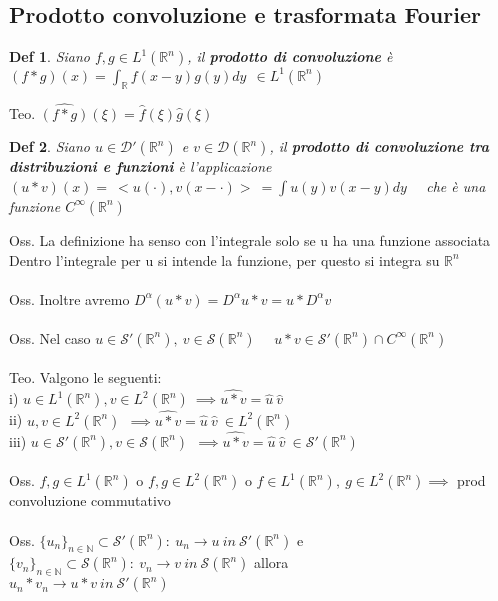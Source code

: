 \documentclass{article}
\theoremstyle{unnumbered}
\newtheorem* {theoremT}{Def}
\theoremstyle{unnumbered1}
\newenvironment{defi}{\begin{gBox}\begin{theoremT}}{\end{theoremT}\end{gBox}}
\renewcommand{\hat}{\widehat}
\begin{document}
\subsection{Prodotto convoluzione e trasformata Fourier}
%
\begin{defi}
Siano $f,g\in L^1(\mathbb{R}^n)$, il \textbf{prodotto di convoluzione} è $(f*g)(x)=\int_{\mathbb{R}}f(x-y)g(y)dy\ \ \in L^1(\mathbb{R}^n)$
\end{defi}
%
Teo. $\widehat{(f*g)}(\xi)=\widehat{f}(\xi)\hat{g}(\xi)$\\
%
%
\begin{defi}
Siano $u\in\mathcal{D}'(\mathbb{R}^n)$ e $v\in\mathcal{D}(\mathbb{R}^n)$, il \textbf{prodotto di convoluzione tra distribuzioni e funzioni} è l'applicazione $(u*v)(x)= \ <u(\cdot),v(x-\cdot)>\ =\int u(y)v(x-y) dy $ \ \  che è una funzione $C^{\infty}(\mathbb{R}^n)$
\end{defi}
%
Oss. La definizione ha senso con l'integrale solo se u ha una funzione associata \\
Dentro l'integrale per u si intende la funzione, per questo si integra su $\mathbb{R}^n$\\ \\
%
Oss. Inoltre avremo $D^{\alpha}(u*v)=D^{\alpha}u *v=u*D^{\alpha}v$\\ \\
%
%
Oss. Nel caso $u\in\mathcal{S}'(\mathbb{R}^n), \ v\in\mathcal{S}(\mathbb{R}^n)$ \ \ $u*v \in \mathcal{S}'(\mathbb{R}^n)\cap C^{\infty}(\mathbb{R}^n)$\\ \\
%
%
Teo. Valgono le seguenti: \\
i) $u\in L^1(\mathbb{R}^n), v\in L^2(\mathbb{R}^n) \ \implies \hat{u*v}=\hat{u} \ \hat{v}$\\
ii) $u,v\in L^2(\mathbb{R}^n) \ \ \implies \hat{u*v}=\hat{u}\ \hat{v} \ \in L^2(\mathbb{R}^n)$\\
iii) $u\in\mathcal{S}'(\mathbb{R}^n), v\in\mathcal{S}(\mathbb{R}^n) \ \ \implies \hat{u*v}=\hat{u}\ \hat{v} \ \in \mathcal{S}'(\mathbb{R}^n)$\\ \\
%
%
Oss. $f,g\in L^1(\mathbb{R}^n)$ o $f,g\in L^2(\mathbb{R}^n)$ o $f\in L^1(\mathbb{R}^n), \ g\in L^2(\mathbb{R}^n) \implies$ prod convoluzione commutativo\\ \\
%
Oss. $\{u_n\}_{n\in\mathbb{N}}\subset\mathcal{S}'(\mathbb{R}^n): \ u_n\to u \ in \ \mathcal{S}'(\mathbb{R}^n)$ e $\{v_n\}_{n\in\mathbb{N}}\subset\mathcal{S}(\mathbb{R}^n): \ v_n\to v \ in \ \mathcal{S}(\mathbb{R}^n)$ allora\\
$u_n * v_n \to u*v \ in \ \mathcal{S}'(\mathbb{R}^n)$\\
\end{document}

